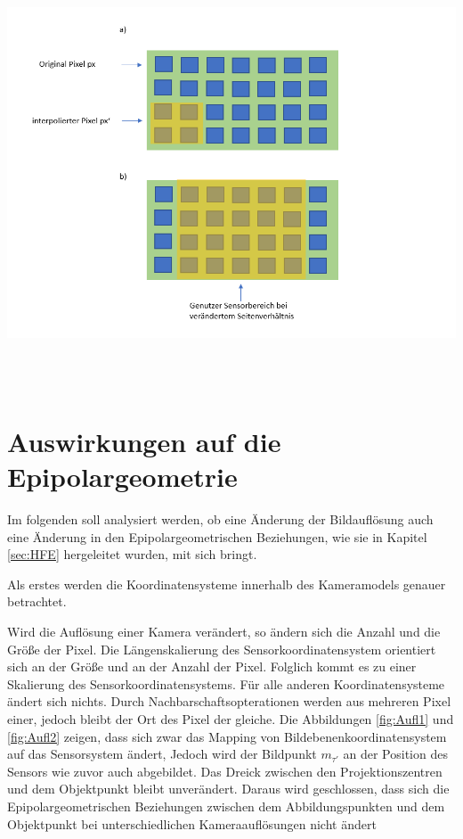 \begin{minipage}{\linewidth}
	\centering
	\includegraphics[width=1.\linewidth]{images/AufloesungSensor.png}
	\label{fig:SensorResolutions}
\end{minipage}\\ \\

\section{Auswirkungen auf die Epipolargeometrie}

Im folgenden soll analysiert werden, ob eine Änderung der Bildauflösung auch eine Änderung in den Epipolargeometrischen Beziehungen, wie sie in Kapitel \ref{sec:HFE} hergeleitet wurden, mit sich bringt. 

Als erstes werden die Koordinatensysteme innerhalb des Kameramodels genauer betrachtet. 

Wird die Auflösung einer Kamera verändert, so ändern sich die Anzahl und die Größe der Pixel. Die Längenskalierung des Sensorkoordinatensystem orientiert sich an der Größe und an der Anzahl der Pixel. Folglich kommt es zu einer Skalierung des Sensorkoordinatensystems. Für alle anderen Koordinatensysteme ändert sich nichts. Durch Nachbarschaftsopterationen werden aus mehreren Pixel einer, jedoch bleibt der Ort des Pixel der gleiche\cite{Doessel}.  Die Abbildungen \ref{fig:Aufl1} und \ref{fig:Aufl2} zeigen, dass sich zwar das Mapping von Bildebenenkoordinatensystem auf das Sensorsystem ändert, Jedoch wird der Bildpunkt $m_{\tau'}$ an der Position des Sensors wie zuvor auch abgebildet. Das Dreick zwischen den Projektionszentren und dem Objektpunkt bleibt unverändert. Daraus wird geschlossen, dass sich die Epipolargeometrischen Beziehungen zwischen dem Abbildungspunkten und dem Objektpunkt bei unterschiedlichen Kameraauflösungen nicht ändert 


